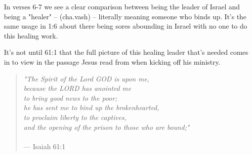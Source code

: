 \documentclass[11pt]{article}
\begin{document}
In verses 6-7 we see a clear comparison between being the leader of Israel and being a "healer" –  (cha.vash) – literally
meaning someone who binds up. It's the same usage in 1:6 about there being sores abounding in Israel with no one to do this healing work.

{\vspace{1em}}

It's not until 61:1 that the full picture of this healing leader that's needed comes in to view in the passage Jesus read from
when kicking off his ministry.

{\vspace{1em}}

\begin{quote}
\textit{"The Spirit of the Lord GOD is upon me,\\ because the LORD has anointed me\\to bring good news to the poor;\\ he has sent me to bind up the brokenhearted,\\ to proclaim liberty to the captives,\\ and the opening of the prison to those who are bound;"}\\\\
\hfill --- Isaiah 61:1
\end{quote}
\end{document}
